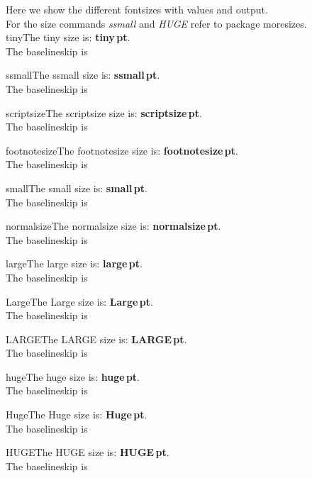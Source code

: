 \documentclass[10pt]{report}
\makeatletter
\newcommand{\mysize}[1]{%
  \bgroup\noindent\csname#1\endcsname The #1 size is: \textbf{\csname#1\endcsname\f@size\,pt}.\\The  baselineskip is \the\baselineskip\par\vskip2mm\egroup}
\makeatother
\begin{document}
\noindent
Here we show the different fontsizes with values and output. \\
For the size commands \emph{ssmall} and \emph{HUGE} refer to package \textsf{moresizes}.
\\[1em]
\mysize{tiny}
\mysize{ssmall}
\mysize{scriptsize}
\mysize{footnotesize}
\mysize{small}
\mysize{normalsize}
\mysize{large}
\mysize{Large}
\mysize{LARGE}
\mysize{huge}
\mysize{Huge}
\mysize{HUGE}
\end{document}
